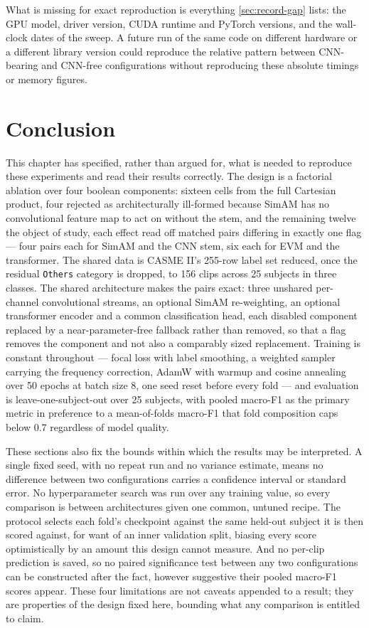 What is missing for exact reproduction is everything \autoref{sec:record-gap} lists: the GPU model, driver version, CUDA runtime and PyTorch versions, and the wall-clock dates of the sweep. A future run of the same code on different hardware or a different library version could reproduce the relative pattern between CNN-bearing and CNN-free configurations without reproducing these absolute timings or memory figures.


\section{Conclusion}
\label{sec:ch4-conclusion}

This chapter has specified, rather than argued for, what is needed to reproduce these experiments and read their results correctly. The design is a factorial ablation over four boolean components: sixteen cells from the full Cartesian product, four rejected as architecturally ill-formed because SimAM has no convolutional feature map to act on without the stem, and the remaining twelve the object of study, each effect read off matched pairs differing in exactly one flag --- four pairs each for SimAM and the CNN stem, six each for EVM and the transformer. The shared data is CASME II's 255-row label set reduced, once the residual \texttt{Others} category is dropped, to 156 clips across 25 subjects in three classes. The shared architecture makes the pairs exact: three unshared per-channel convolutional streams, an optional SimAM re-weighting, an optional transformer encoder and a common classification head, each disabled component replaced by a near-parameter-free fallback rather than removed, so that a flag removes the component and not also a comparably sized replacement. Training is constant throughout --- focal loss with label smoothing, a weighted sampler carrying the frequency correction, AdamW with warmup and cosine annealing over 50 epochs at batch size 8, one seed reset before every fold --- and evaluation is leave-one-subject-out over 25 subjects, with pooled macro-F1 as the primary metric in preference to a mean-of-folds macro-F1 that fold composition caps below 0.7 regardless of model quality.

These sections also fix the bounds within which the results may be interpreted. A single fixed seed, with no repeat run and no variance estimate, means no difference between two configurations carries a confidence interval or standard error. No hyperparameter search was run over any training value, so every comparison is between architectures given one common, untuned recipe. The protocol selects each fold's checkpoint against the same held-out subject it is then scored against, for want of an inner validation split, biasing every score optimistically by an amount this design cannot measure. And no per-clip prediction is saved, so no paired significance test between any two configurations can be constructed after the fact, however suggestive their pooled macro-F1 scores appear. These four limitations are not caveats appended to a result; they are properties of the design fixed here, bounding what any comparison is entitled to claim.
